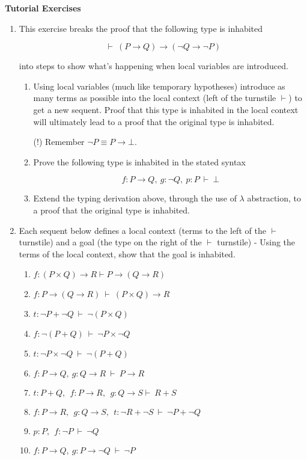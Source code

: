 \documentclass[11pt]{report}
\begin{document}
\newpage
{\bf Tutorial Exercises}

\begin{enumerate}
	
	\item This exercise breaks the proof that the following type is inhabited
	
	$$\vdash \ (P \to Q) \to (\lnot Q \to \lnot P)$$

	into steps to show what's happening when local variables are introduced. 

	\begin{enumerate}

		\item Using local variables (much like temporary hypotheses) introduce as many terms as possible into the local context (left of the turnstile $\vdash$) to get a new sequent. Proof that this type is inhabited in the local context will ultimately lead to a proof that the original type is inhabited. 
		
		(!) Remember $\lnot P \equiv P \to \bot$.

		\item Prove the following type is inhabited in the stated syntax 
		
		$$ f : P \to Q, \ g : \lnot Q, \ p : P \ \vdash \ \bot$$

		\item Extend the typing derivation above, through the use of $\lambda$ abstraction, to a proof that the original type is inhabited.

	\end{enumerate}
	
	\item Each sequent below defines a local context (terms to the left of the $\vdash$ turnstile) and a goal (the type on the right of the $\vdash$ turnstile) - Using the terms of the local context, show that the goal is inhabited.

	\begin{enumerate}
		\item $f : ( P\times Q) \rightarrow  R \vdash  P \rightarrow (Q \rightarrow  R)$
		\item $f : P \rightarrow (Q \rightarrow  R) \ \vdash \ (P\times Q) \rightarrow R$
		\item $t : \lnot P + \lnot Q \ \vdash \ \lnot(P\times  Q)$
		\item $f : \lnot(P + Q) \ \vdash \ \lnot P \times \lnot Q$
		\item $t : \lnot P \times \lnot Q \ \vdash \ \lnot(P + Q) $
		\item $f : P\rightarrow  Q, \  g : Q \rightarrow  R \ \vdash \ P \rightarrow R$
		\item $t : P + Q,\ \ f : P \to  R,\ \  g : Q \to S \vdash \ R + S$
		\item $f : P \to  R,\ \ g : Q \to  S,\ \ t : \neg R + \neg S \ \vdash \ \neg P + \neg Q$
		\item $p : P,\ \ f : \neg P \ \vdash \ \neg Q$
	   	\item $f : P \rightarrow Q, \  g : P\rightarrow \lnot Q \ \vdash \ \lnot P$
	\end{enumerate}		


\end{enumerate}
\end{document}
